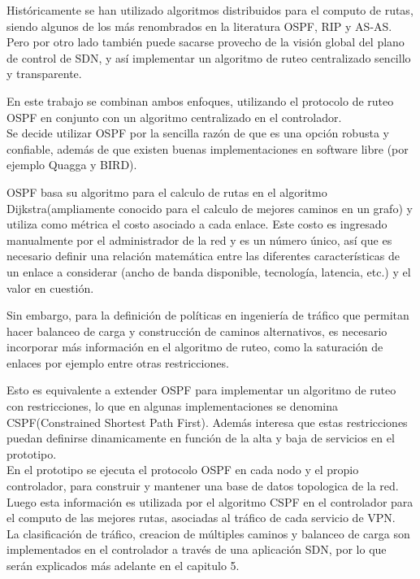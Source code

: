 Hist\'oricamente se han utilizado algoritmos distribuidos para el computo de rutas, siendo algunos de los m\'as renombrados en la literatura OSPF, RIP y AS-AS. Pero por otro lado también puede sacarse provecho de la visi\'on global del plano de control de SDN, y as\'i implementar un algoritmo de ruteo centralizado sencillo y transparente.

En este trabajo se combinan ambos enfoques, utilizando el protocolo de ruteo OSPF en conjunto con un algoritmo centralizado en el controlador.\\

Se decide utilizar OSPF por la sencilla razón de que es una opción robusta y confiable, adem\'as de que existen buenas implementaciones en software libre (por ejemplo Quagga y BIRD).

OSPF basa su algoritmo para el calculo de rutas en el algoritmo Dijkstra(ampliamente conocido para el calculo de mejores caminos en un grafo) y utiliza como m\'etrica el costo asociado a cada enlace. Este costo es ingresado manualmente por el administrador de la red y es un n\'umero \'unico, as\'i que es necesario definir una relaci\'on matem\'atica entre las diferentes caracter\'isticas de un enlace a considerar (ancho de banda disponible, tecnolog\'ia, latencia, etc.) y el valor en cuestión.

Sin embargo, para la definición de políticas en ingeniería de tr\'afico que permitan hacer balanceo de carga y construcción de caminos alternativos, es necesario incorporar m\'as informaci\'on en el algoritmo de ruteo, como la saturaci\'on de enlaces por ejemplo entre otras restricciones.

Esto es equivalente a extender OSPF para implementar un algoritmo de ruteo con restricciones, lo que en algunas implementaciones se denomina CSPF(Constrained Shortest Path First). Adem\'as interesa que estas restricciones puedan definirse dinamicamente en función de la alta y baja de servicios en el prototipo.\\

En el prototipo se ejecuta el protocolo OSPF en cada nodo y el propio controlador, para construir y mantener una base de datos topologica de la red. Luego esta información es utilizada por el algoritmo CSPF en el controlador para el computo de las mejores rutas, asociadas al tr\'afico de cada servicio de VPN.\\

La clasificaci\'on de tr\'afico, creacion de m\'ultiples caminos y balanceo de carga son implementados en el controlador a través de una aplicaci\'on SDN, por lo que ser\'an explicados m\'as adelante en el capitulo 5.


